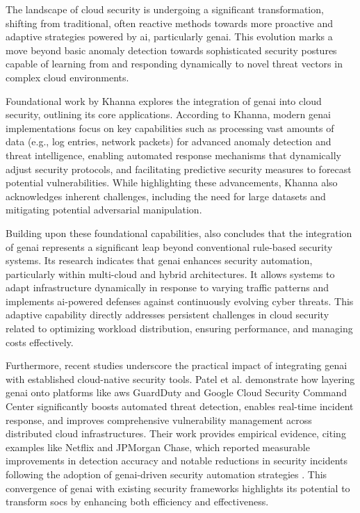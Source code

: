 The landscape of cloud security is undergoing a significant transformation, shifting from traditional, often reactive methods towards more proactive and adaptive strategies powered by \gls{ai}, particularly \gls{genai}. This evolution marks a move beyond basic anomaly detection towards sophisticated security postures capable of learning from and responding dynamically to novel threat vectors in complex cloud environments.

Foundational work by Khanna \cite{khanna_enhancing_2024} explores the integration of \gls{genai} into cloud security, outlining its core applications. According to Khanna, modern \gls{genai} implementations focus on key capabilities such as processing vast amounts of data (e.g., log entries, network packets) for advanced anomaly detection and threat intelligence, enabling automated response mechanisms that dynamically adjust security protocols, and facilitating predictive security measures to forecast potential vulnerabilities. While highlighting these advancements, Khanna also acknowledges inherent challenges, including the need for large datasets and mitigating potential adversarial manipulation.

Building upon these foundational capabilities, \cite{seth_ai_2025} also concludes that the integration of \gls{genai} represents a significant leap beyond conventional rule-based security systems. Its research indicates that \gls{genai} enhances security automation, particularly within multi-cloud and hybrid architectures. It allows systems to adapt infrastructure dynamically in response to varying traffic patterns and implements \gls{ai}-powered defenses against continuously evolving cyber threats. This adaptive capability directly addresses persistent challenges in cloud security related to optimizing workload distribution, ensuring performance, and managing costs effectively.

Furthermore, recent studies underscore the practical impact of integrating \gls{genai} with established cloud-native security tools. Patel et al. \cite{patel_generative_2025} demonstrate how layering \gls{genai} onto platforms like \gls{aws} GuardDuty and Google Cloud Security Command Center significantly boosts automated threat detection, enables real-time incident response, and improves comprehensive vulnerability management across distributed cloud infrastructures. Their work provides empirical evidence, citing examples like Netflix and JPMorgan Chase, which reported measurable improvements in detection accuracy and notable reductions in security incidents following the adoption of \gls{genai}-driven security automation strategies \cite{patel_generative_2025}. This convergence of \gls{genai} with existing security frameworks highlights its potential to transform \glspl{soc} by enhancing both efficiency and effectiveness.

